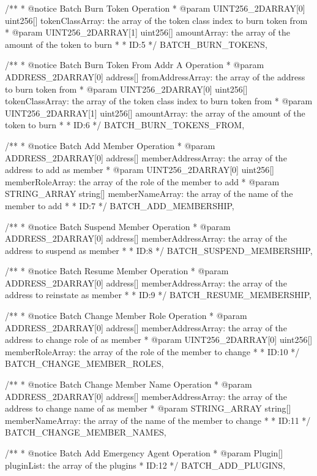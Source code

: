\documentclass[main.tex]{subfiles}
\begin{document}
\begin{spverbatim}
  /**
   * @notice Batch Burn Token Operation
   * @param UINT256_2DARRAY[0] uint256[] tokenClassArray: the array of the token class index to burn token from
   * @param UINT256_2DARRAY[1] uint256[] amountArray: the array of the amount of the token to burn
   * 
   * ID:5
   */
  BATCH_BURN_TOKENS,

  /**
   * @notice Batch Burn Token From Addr A Operation
   * @param ADDRESS_2DARRAY[0] address[] fromAddressArray: the array of the address to burn token from
   * @param UINT256_2DARRAY[0] uint256[] tokenClassArray: the array of the token class index to burn token from
   * @param UINT256_2DARRAY[1] uint256[] amountArray: the array of the amount of the token to burn
   * 
   * ID:6
   */
  BATCH_BURN_TOKENS_FROM,

  /**
   * @notice Batch Add Member Operation
   * @param ADDRESS_2DARRAY[0] address[] memberAddressArray: the array of the address to add as member
   * @param UINT256_2DARRAY[0] uint256[] memberRoleArray: the array of the role of the member to add
   * @param STRING_ARRAY string[] memberNameArray: the array of the name of the member to add
   * 
   * ID:7
   */
  BATCH_ADD_MEMBERSHIP,

  /**
   * @notice Batch Suspend Member Operation
   * @param ADDRESS_2DARRAY[0] address[] memberAddressArray: the array of the address to suspend as member
   * 
   * ID:8
   */
  BATCH_SUSPEND_MEMBERSHIP,

  /**
   * @notice Batch Resume Member Operation
   * @param ADDRESS_2DARRAY[0] address[] memberAddressArray: the array of the address to reinstate as member
   * 
   * ID:9
   */
  BATCH_RESUME_MEMBERSHIP,

  /**
   * @notice Batch Change Member Role Operation
   * @param ADDRESS_2DARRAY[0] address[] memberAddressArray: the array of the address to change role of as member
   * @param UINT256_2DARRAY[0] uint256[] memberRoleArray: the array of the role of the member to change
   * 
   * ID:10
   */
  BATCH_CHANGE_MEMBER_ROLES,

  /**
   * @notice Batch Change Member Name Operation
   * @param ADDRESS_2DARRAY[0] address[] memberAddressArray: the array of the address to change name of as member
   * @param STRING_ARRAY string[] memberNameArray: the array of the name of the member to change
   * 
   * ID:11
   */
  BATCH_CHANGE_MEMBER_NAMES,

  /**
   * @notice Batch Add Emergency Agent Operation
   * @param Plugin[] pluginList: the array of the plugins
   * ID:12
   */
  BATCH_ADD_PLUGINS,


\end{spverbatim}
\end{document}

